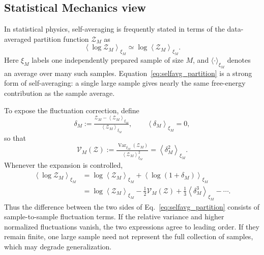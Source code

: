 \clearpage

\subsection{Statistical Mechanics view}
\label{sxn:selfavg_statmech}

In statistical physics, self-averaging is frequently stated in terms of the
data-averaged partition function $\mathcal Z_M$ as
\begin{equation}
\left\langle\log\mathcal Z_M\right\rangle_{\xi_M}
\simeq
\log\left\langle\mathcal Z_M\right\rangle_{\xi_M}.
\label{eq:selfavg_partition}
\end{equation}
Here $\xi_M$ labels one independently prepared sample of size $M$, and
$\langle\cdot\rangle_{\xi_M}$ denotes an average over many such samples.
Equation~\eqref{eq:selfavg_partition} is a strong form of self-averaging:
a single large sample gives nearly the same free-energy contribution as the
sample average.

To expose the fluctuation correction, define
\begin{equation}
\delta_M
:=
\tfrac{
\mathcal Z_M-\left\langle\mathcal Z_M\right\rangle_{\xi_M}
}{
\left\langle\mathcal Z_M\right\rangle_{\xi_M}
},
\qquad
\left\langle\delta_M\right\rangle_{\xi_M}=0,
\label{eq:relative_partition_fluctuation}
\end{equation}
so that
\begin{equation}
\mathcal V_M(\mathcal Z)
:=
\tfrac{
\operatorname{Var}_{\xi_M}(\mathcal Z_M)
}{
\left\langle\mathcal Z_M\right\rangle_{\xi_M}^{2}
}
=
\left\langle\delta_M^2\right\rangle_{\xi_M}.
\label{eq:relative_variance_partition}
\end{equation}
Whenever the expansion is controlled,
\begin{equation}
\begin{aligned}
\left\langle\log\mathcal Z_M\right\rangle_{\xi_M}
&=
\log\left\langle\mathcal Z_M\right\rangle_{\xi_M}
+
\left\langle\log(1+\delta_M)\right\rangle_{\xi_M}
\\
&=
\log\left\langle\mathcal Z_M\right\rangle_{\xi_M}
-\tfrac12\mathcal V_M(\mathcal Z)
+\tfrac13\left\langle\delta_M^3\right\rangle_{\xi_M}
-\cdots.
\end{aligned}
\label{eq:annealed_quenched_expansion}
\end{equation}
Thus the difference between the two sides of
Eq.~\eqref{eq:selfavg_partition} consists of sample-to-sample fluctuation
terms. If the relative variance and higher normalized fluctuations vanish,
the two expressions agree to leading order. If they remain finite, one large
sample need not represent the full collection of samples, which may degrade generalization.

